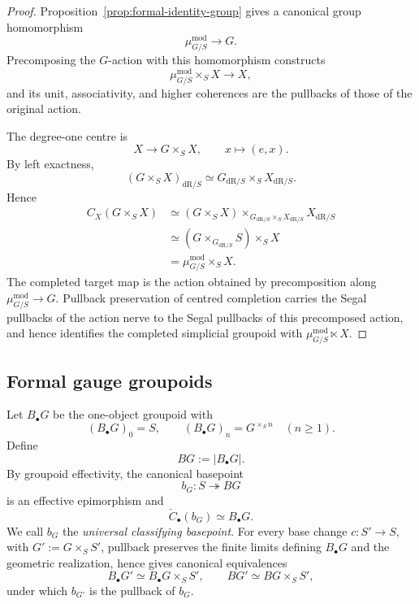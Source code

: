 \begin{proof}
Proposition~\ref{prop:formal-identity-group} gives a canonical group
homomorphism
\[
    \mu^{\mathrm{mod}}_{G/S}\longrightarrow G.
\]
Precomposing the $G$-action with this homomorphism constructs
\[
    \mu^{\mathrm{mod}}_{G/S}\times_SX\longrightarrow X,
\]
and its unit, associativity, and higher coherences are the pullbacks of those
of the original action.

The degree-one centre is
\[
    X\longrightarrow G\times_SX,
    \qquad
    x\longmapsto(e,x).
\]
By left exactness,
\[
    (G\times_SX)_{\mathrm{dR}/S}
    \simeq
    G_{\mathrm{dR}/S}
    \times_S
    X_{\mathrm{dR}/S}.
\]
Hence
\[
\begin{aligned}
    C_X(G\times_SX)
    &\simeq
    (G\times_SX)
    \times_{
        G_{\mathrm{dR}/S}\times_SX_{\mathrm{dR}/S}
    }
    X_{\mathrm{dR}/S}\\
    &\simeq
    \left(
        G\times_{G_{\mathrm{dR}/S}}S
    \right)
    \times_SX\\
    &=
    \mu^{\mathrm{mod}}_{G/S}\times_SX.
\end{aligned}
\]
The completed target map is the action obtained by precomposition along
$\mu^{\mathrm{mod}}_{G/S}\to G$.  Pullback preservation of centred
completion carries the Segal pullbacks of the action nerve to the Segal
pullbacks of this precomposed action, and hence identifies the completed
simplicial groupoid with $\mu^{\mathrm{mod}}_{G/S}\ltimes X$.
\end{proof}

\subsection{Formal gauge groupoids}

\begin{definition}
\label{def:classifying-object-group}
Let $B_\bullet G$ be the one-object groupoid with
\[
    (B_\bullet G)_0=S,
    \qquad
    (B_\bullet G)_n=G^{\times_S n}
    \quad(n\geq1).
\]
Define
\[
    BG:=|B_\bullet G|.
\]
By groupoid effectivity, the canonical basepoint
\[
    b_G:S\twoheadrightarrow BG
\]
is an effective epimorphism and
\[
    \check C_\bullet(b_G)\simeq B_\bullet G.
\]
We call $b_G$ the \emph{universal classifying basepoint}.  For every base
change $c:S'\to S$, with $G':=G\times_SS'$, pullback preserves the finite
limits defining $B_\bullet G$ and the geometric realization, hence gives
canonical equivalences
\[
    B_\bullet G'
    \simeq
    B_\bullet G\times_SS',
    \qquad
    BG'\simeq BG\times_SS',
\]
under which $b_{G'}$ is the pullback of $b_G$.
\end{definition}

